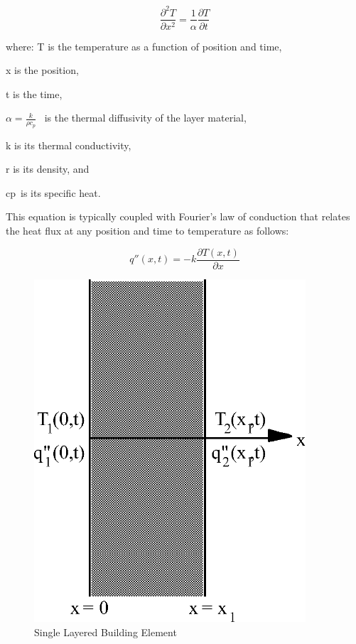 \begin{equation}
\frac{{{\partial ^2}T}}{{\partial {x^2}}} = \frac{1}{\alpha }\frac{{\partial T}}{{\partial t}}
\end{equation}

where: T is the temperature as a function of position and time,

x is the position,

t is the time,

\(\alpha = \frac{k}{{\rho {c_p}}}\) ~is the thermal diffusivity of the layer material,

k is its thermal conductivity,

r is its density, and

cp~is its specific heat.

This equation is typically coupled with Fourier's law of conduction that relates the heat flux at any position and time to temperature as follows:

\begin{equation}
q''\left( {x,t} \right) =  - k\frac{{\partial T\left( {x,t} \right)}}{{\partial x}}
\end{equation}

\begin{figure}[hbtp] %
\centering
\includegraphics[width=0.9\textwidth, height=0.9\textheight, keepaspectratio=true]{media/image5973.png}
\caption{Single Layered Building Element \protect \label{fig:single-layered-building-element}}
\end{figure}

